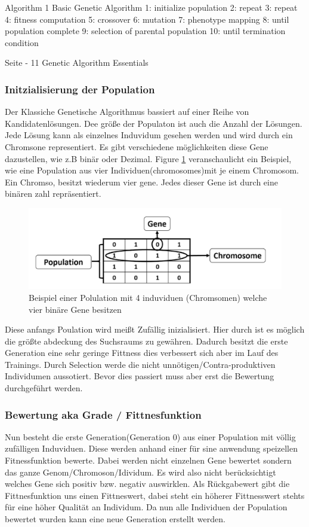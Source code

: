 Algorithm 1 Basic Genetic Algorithm
1: initialize population
2: repeat
3: 		repeat
4:			fitness computation
5:			crossover
6:			mutation
7:			phenotype mapping
8:		until population complete
9:		selection of parental population
10: until termination condition

Seite - 11 Genetic Algorithm Essentials
\fi 

\subsubsection{Initzialisierung der Population}
Der Klassiche Genetische Algorithmus bassiert auf einer Reihe von Kandidatenlösungen. Dee größe der Populaton ist auch die Anzahl der Lösungen. Jede Lösung kann als einzelnes Induvidum gesehen werden und wird durch ein Chromsone representiert. Es gibt verschiedene möglichkeiten diese Gene dazustellen, wie z.B binär oder Dezimal.
Figure \ref{fig:chromosome} veranschaulicht ein Beispiel, wie eine Population aus vier Individuen(chromosomes)mit je einem Chromosom. Ein Chromso, besitzt wiederum  vier gene. Jedes dieser Gene ist durch eine binären zahl repräsentiert. 

\noindent%
\begin{figure}[H]
  \centering  
  \includegraphics[scale=0.3]{img/Chromsome-s134-PracticalComputerVion.png}
  \caption{Beispiel einer Polulation mit 4 induviduen (Chromsomen) welche vier binäre Gene besitzen \cite{rashid2017neuronale} }
  \label{fig:chromosome}
\end{figure}

Diese anfangs Poulation wird meißt Zufällig inizialisiert. Hier durch ist es möglich die größte abdeckung des Suchsraums zu gewähren. Dadurch besitzt die erste Generation eine sehr geringe Fittness dies verbessert sich aber im Lauf des Trainings. Durch Selection werde die nicht unnötigen/Contra-produktiven Individumen aussotiert. Bevor dies passiert muss aber erst die Bewertung durchgeführt werden.


\subsubsection{Bewertung aka Grade / Fittnesfunktion}
Nun besteht die erste Generation(Generation 0) aus einer Population mit völlig zufälligen Induviduen. Diese werden anhand einer für sine anwendung speizellen Fitnessfunktion bewerte. Dabei werden nicht einzelnen Gene bewertet sondern das ganze Genom/Chromoson/Idividum. Es wird also nicht berücksichtigt welches Gene sich positiv bzw. negativ auswirklen. Als Rückgabewert gibt die Fittnesfunktion uns einen Fittneswert, dabei steht ein höherer Fittnesswert stehts für eine höher Qualität an Individum. Da nun alle Individuen der Population bewertet wurden kann eine neue Generation erstellt werden.


